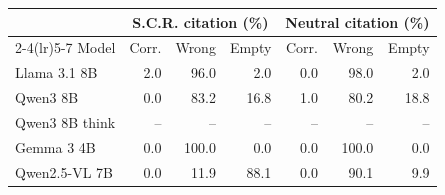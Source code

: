 \begin{tabular}{lrrrrrr}
\toprule
& \multicolumn{3}{c}{S.C.R. citation (\%)} & \multicolumn{3}{c}{Neutral citation (\%)} \\
\cmidrule(lr){2-4}\cmidrule(lr){5-7}
Model & Corr. & Wrong & Empty & Corr. & Wrong & Empty \\
\midrule
Llama 3.1 8B & 2.0 & 96.0 & 2.0 & 0.0 & 98.0 & 2.0 \\
Qwen3 8B & 0.0 & 83.2 & 16.8 & 1.0 & 80.2 & 18.8 \\
Qwen3 8B think & -- & -- & -- & -- & -- & -- \\
Gemma 3 4B & 0.0 & 100.0 & 0.0 & 0.0 & 100.0 & 0.0 \\
Qwen2.5-VL 7B & 0.0 & 11.9 & 88.1 & 0.0 & 90.1 & 9.9 \\
\bottomrule
\end{tabular}
